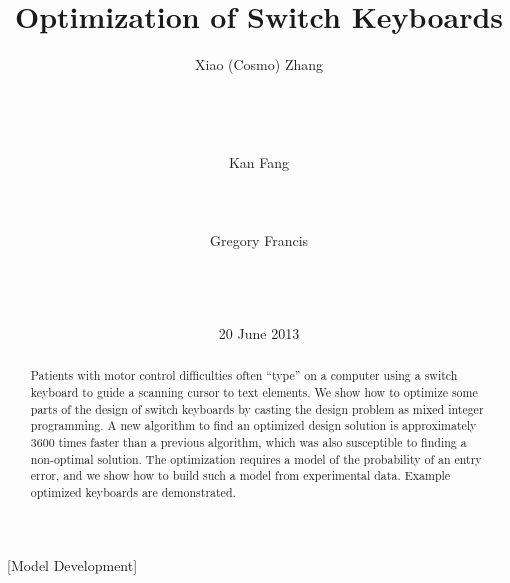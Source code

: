 \documentclass{sig-alternate}
\begin{document}


\title{Optimization of Switch Keyboards  }


 \author{
\alignauthor
Xiao (Cosmo) Zhang\\
       \\
       \\
       \\
       \\
\alignauthor
Kan Fang\\
       \\
       \\
       \\
\alignauthor 
Gregory Francis\\
\\
       \\
       \\
}
\date{20 June 2013}
\maketitle
\begin{abstract}
Patients with motor control difficulties often ``type'' on a  computer using a switch keyboard to guide a scanning cursor to text elements. We show how to optimize some parts of the design of switch keyboards by casting the design problem as mixed integer programming. A new algorithm to find an optimized design solution is approximately 3600 times faster than a previous algorithm, which was also susceptible to finding a non-optimal solution. The optimization requires a model of the probability of an entry error, and we show how to build such a model from experimental data. Example optimized keyboards are demonstrated. 

\end{abstract}

[Model Development]
\end{document}
